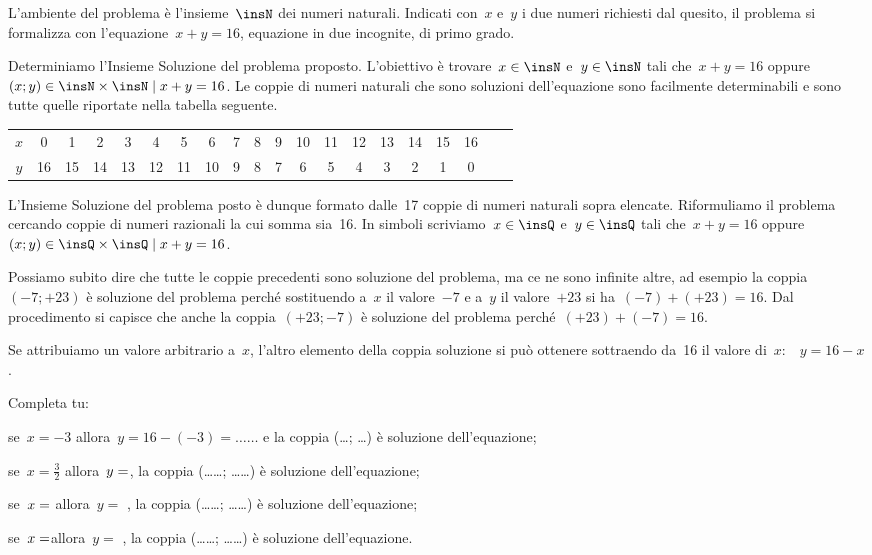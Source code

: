 \begin{soluzione}
L'ambiente del problema è l'insieme~$\insN$ dei numeri naturali. Indicati con~$x$ e~$y$ i due numeri
richiesti dal quesito, il problema si formalizza con l'equazione~$x+y=16$, equazione in due incognite, di
primo grado.

Determiniamo l'Insieme Soluzione del problema proposto.
L'obiettivo è trovare~$x\in\insN$ e~$y\in\insN$ tali che~$x+y=16$ oppure~$(x;y)\in\insN\times\insN\mid x+y=16$.
Le coppie di numeri naturali che sono soluzioni
dell'equazione sono facilmente determinabili e sono
tutte quelle riportate nella tabella seguente.

\begin{tabular}{cccccccccccccccccccc}
\toprule
$x$ & 0 & 1 & 2 & 3 & 4 & 5 & 6 & 7 & 8 & 9 & 10 & 11 & 12 & 13 & 14 & 15 & 16\\
$y$ & 16 & 15 & 14 & 13 & 12 & 11 & 10 & 9 & 8 & 7 & 6 & 5 & 4 & 3 & 2 & 1 & 0\\
\bottomrule
\end{tabular}

L'Insieme Soluzione del problema posto è dunque
formato dalle~17 coppie di numeri naturali sopra elencate.
Riformuliamo il problema cercando coppie di numeri razionali la cui
somma sia~16.
In simboli scriviamo~$x\in\insQ$ e~$y\in\insQ$ tali che~$x+y=16$ oppure~$(x;y)\in\insQ\times\insQ\mid  x+y=16$.

Possiamo subito dire che tutte le coppie precedenti sono soluzione del
problema, ma ce ne sono infinite altre, ad esempio la coppia~$(-7;+23)$ è soluzione del problema perché sostituendo a~$x$ il
valore~$-7$ e a~$y$ il valore~$+23$ si ha~$(-7)+(+23)=16$.
Dal procedimento si capisce che anche la coppia~$(+23;-7)$ è
soluzione del problema perché~$(+23)+(-7)=16$.

Se attribuiamo un valore arbitrario a~$x$, l'altro
elemento della coppia soluzione si può ottenere sottraendo da~16 il
valore di~$x$:~~$y=16-x$.

Completa tu:

\begin{itemize*}
\item se~$x=-3$ allora~$y=16-(-3)=\ldots\ldots$ e la coppia (\ldots; \ldots) è soluzione dell'equazione;
\item se~$x=\frac{3}{2}$ allora~$y =\dotfill$, la coppia (\ldots\ldots; \ldots\ldots) è soluzione dell'equazione;
\item se~$x =\dotfill$ allora~$y=$ \dotfill, la coppia (\ldots\ldots; \ldots\ldots) è soluzione dell'equazione;
\item se~$x=\dotfill$allora~$y =$ \dotfill, la coppia (\ldots\ldots; \ldots\ldots) è soluzione dell'equazione.
\end{itemize*}


\end{soluzione}
